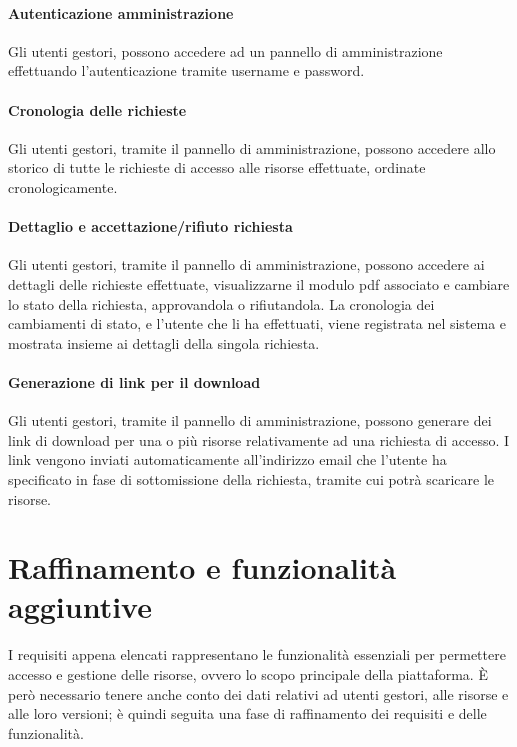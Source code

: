 \paragraph{Autenticazione amministrazione}
Gli utenti gestori, possono accedere ad un pannello di amministrazione
effettuando l'autenticazione tramite username e password.

\paragraph{Cronologia delle richieste}
Gli utenti gestori, tramite il pannello di amministrazione, possono accedere allo
storico di tutte le richieste di accesso alle risorse effettuate, ordinate
cronologicamente.

\paragraph{Dettaglio e accettazione/rifiuto richiesta}
Gli utenti gestori, tramite il pannello di amministrazione, possono accedere ai
dettagli delle richieste effettuate, visualizzarne il modulo pdf associato e
cambiare lo stato della richiesta, approvandola o rifiutandola.
La cronologia dei cambiamenti di stato, e l'utente che li ha effettuati, viene
registrata nel sistema e mostrata insieme ai dettagli della singola richiesta.

\paragraph{Generazione di link per il download}
Gli utenti gestori, tramite il pannello di amministrazione, possono generare dei
link di download per una o più risorse relativamente ad una richiesta di accesso.
I link vengono inviati automaticamente all'indirizzo email che l'utente ha specificato
in fase di sottomissione della richiesta, tramite cui potrà scaricare le risorse.



\section{Raffinamento e funzionalità aggiuntive}
I requisiti appena elencati rappresentano le funzionalità essenziali per permettere
accesso e gestione delle risorse, ovvero lo scopo principale della piattaforma.
È però necessario tenere anche conto dei dati relativi ad utenti gestori, alle
risorse e alle loro versioni; è quindi seguita una fase di raffinamento dei
requisiti e delle funzionalità.



